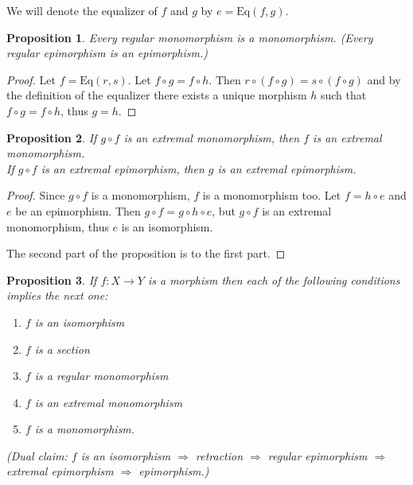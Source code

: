 \documentclass[12pt]{article}
\newcommand{\Map}[3]{#1:#2\to#3}
\newcommand{\Eq}{\mathrm{Eq}}
\newcommand{\Coeq}{\mathrm{Coeq}}
\newtheorem{PROP}{Proposition}
\begin{document}
We will denote the equalizer of $f$ and $g$ by $e=\Eq(f,g)$. 

\begin{PROP}
Every regular monomorphism is a monomorphism. (Every regular epimorphism is an epimorphism.)
\end{PROP}

\begin{proof}
Let $f=\Eq(r,s)$. Let $f\circ g=f\circ h$. Then $r\circ(f\circ g)=s\circ(f\circ g)$ and by
the definition of the equalizer there exists a unique morphism $h$ such that $f\circ g=f\circ
h$, thus $g=h$.
\end{proof}

\begin{PROP} \label{GFJEEXMONOIMPFEXJEMONO}
If $g\circ f$ is an extremal monomorphism, then $f$ is an extremal monomorphism.\\
If $g\circ f$ is an extremal epimorphism, then $g$ is an extremal epimorphism.
\end{PROP}

\begin{proof}
Since $g\circ f$ is a monomorphism, $f$ is a monomorphism too. Let $f=h\circ e$ and $e$ be an
epimorphism. Then $g\circ f=g\circ h\circ e$, but $g\circ f$ is an extremal monomorphism,
thus $e$ is an isomorphism.

The second part of the proposition is   to the first part.
\end{proof}

\begin{PROP} \label{HIERMOR}
If $\Map fXY$ is a morphism then each of the following conditions implies the next one:
  \begin{enumerate}
  \renewcommand{\labelenumi}{(\roman{enumi})}
    \item $f$ is an isomorphism
    \item $f$ is a section
    \item $f$ is a regular monomorphism
    \item $f$ is an extremal monomorphism
    \item $f$ is a monomorphism.
  \end{enumerate}

(Dual claim: $f$ is an isomorphism $\Rightarrow$ retraction $\Rightarrow$ regular epimorphism
$\Rightarrow$ extremal epimorphism $\Rightarrow$ epimorphism.)
\end{PROP}
\end{document}
